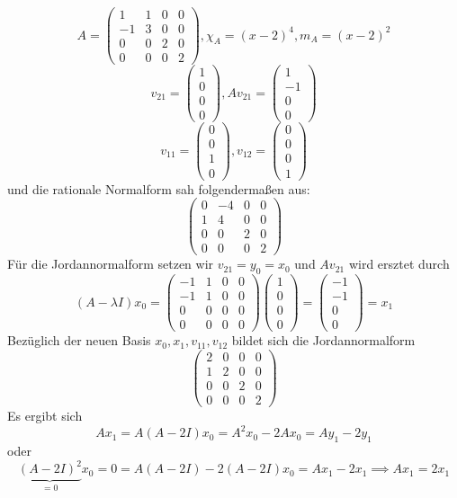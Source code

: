 \documentclass{mycourse}
\begin{document}
\begin{ex}
	\[
	A = \begin{pmatrix}1&1&0&0\\-1&3&0&0\\0&0&2&0\\0&0&0&2\end{pmatrix}, \chi_A = (x-2)^4, m_A = (x-2)^2
	\]
	\[
v_{21} = \begin{pmatrix}1\\0\\0\\0\end{pmatrix}, Av_{21} = \begin{pmatrix}1\\-1\\0\\0\end{pmatrix}
	\]
	\[
	v_{11} = \begin{pmatrix}0\\0\\1\\0\end{pmatrix}, v_{12} = \begin{pmatrix}0\\0\\0\\1\end{pmatrix}
	\]
	und die rationale Normalform sah folgendermaßen aus:
	\[
	\begin{pmatrix} 0&-4&0&0\\1&4&0&0\\0&0&2&0\\0&0&0&2\end{pmatrix}
	\]
	Für die Jordannormalform setzen wir $v_{21}=y_0=x_0$ und $Av_{21}$ wird ersztet durch
	\[
	(A-\lambda I)x_0 = \begin{pmatrix}-1&1&0&0\\-1&1&0&0\\0&0&0&0\\0&0&0&0\end{pmatrix}\begin{pmatrix}1\\0\\0\\0\end{pmatrix} = \begin{pmatrix}-1\\-1\\0\\0\end{pmatrix} = x_1
	\]
	Bezüglich der neuen Basis $x_0, x_1, v_{11}, v_{12}$ bildet sich die Jordannormalform
	\[
	\begin{pmatrix}2&0&0&0\\1&2&0&0\\0&0&2&0\\0&0&0&2\end{pmatrix}
	\]
	Es ergibt sich
	\[
		Ax_1 = A(A - 2I)x_0 = A^2 x_0 -2Ax_0 = A y_1 - 2y_1
	\]
	oder
	\[
		\underbrace{(A-2I)^2}_{=0} x_0 = 0 = A(A-2I) - 2(A-2I)x_0 = Ax_1 - 2x_1 \implies Ax_1 = 2x_1
	\]		
\end{ex}
\end{document}
